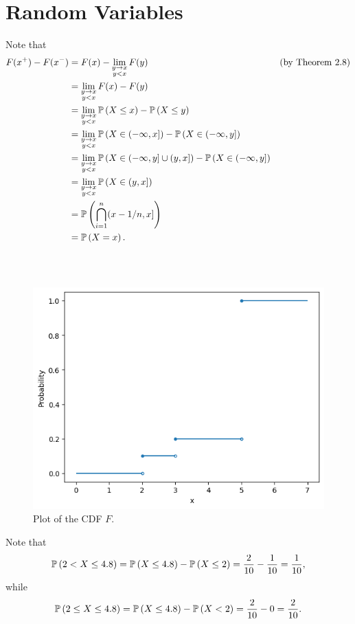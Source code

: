 \chapter{Random Variables}

\begin{ex}
  Note that
  \begin{align*}
    F(x^+)-F(x^-)
     & =F(x)-\lim_{\substack{y\to x    \\ y < x}}F(y) & & \text{(by Theorem 2.8)} \\
     & =\lim_{\substack{y\to x         \\ y < x}}F(x)-F(y) \\
     & =\lim_{\substack{y\to x         \\ y < x}}\P{X\leq x}-\P{X\leq y} \\
     & =\lim_{\substack{y\to x         \\ y < x}}\P{X\in (-\infty, x]}-\P{X\in (-\infty, y]} \\
     & =\lim_{\substack{y\to x         \\ y < x}}\P{X\in (-\infty, y]\cup(y, x]}-\P{X\in (-\infty, y]} \\
     & =\lim_{\substack{y\to x         \\ y < x}}\P{X\in (y, x]} \\
     & =\P{\bigcap_{i=1}^n (x-1/n, x]} \\
     & =\P{X=x}.
  \end{align*}
\end{ex}

\begin{ex}~
  \inputminted{python}{../code/02-02.py}

  \begin{figure}[H]
    \centering
    \includegraphics[scale=0.98]{../images/02-02}
    \caption{Plot of the CDF $F$.}
  \end{figure}

  Note that
  \[
    \P{2< X\leq 4.8}
    =\P{X\leq 4.8}-\P{X\leq 2}
    =\frac{2}{10}-\frac{1}{10}
    =\frac{1}{10},
  \]
  while
  \[
    \P{2\leq X\leq 4.8}=\P{X\leq 4.8}-\P{X< 2}=\frac{2}{10}-0=\frac{2}{10}.
  \]
\end{ex}

